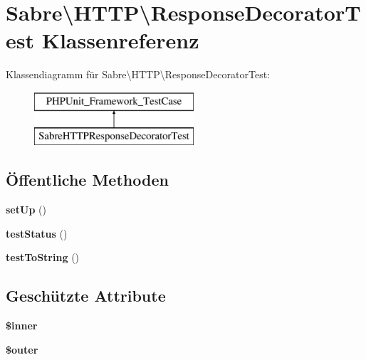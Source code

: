 \hypertarget{class_sabre_1_1_h_t_t_p_1_1_response_decorator_test}{}\section{Sabre\textbackslash{}H\+T\+TP\textbackslash{}Response\+Decorator\+Test Klassenreferenz}
\label{class_sabre_1_1_h_t_t_p_1_1_response_decorator_test}
Klassendiagramm für Sabre\textbackslash{}H\+T\+TP\textbackslash{}Response\+Decorator\+Test\+:\begin{figure}[H]
\begin{center}
\leavevmode
\includegraphics[height=2.000000cm]{class_sabre_1_1_h_t_t_p_1_1_response_decorator_test}
\end{center}
\end{figure}
\subsection*{Öffentliche Methoden}
\begin{DoxyCompactItemize}
\item 
\mbox{\label{class_sabre_1_1_h_t_t_p_1_1_response_decorator_test_adf16a488245407c9aa2bd19720621f0e}} 
{\bfseries set\+Up} ()
\item 
\mbox{\label{class_sabre_1_1_h_t_t_p_1_1_response_decorator_test_aae2bfa0a51eb5a6a6bc58e28f0667917}} 
{\bfseries test\+Status} ()
\item 
\mbox{\label{class_sabre_1_1_h_t_t_p_1_1_response_decorator_test_af6476042d3da4ceab64e46ffcaaf0947}} 
{\bfseries test\+To\+String} ()
\end{DoxyCompactItemize}
\subsection*{Geschützte Attribute}
\begin{DoxyCompactItemize}
\item 
\mbox{\label{class_sabre_1_1_h_t_t_p_1_1_response_decorator_test_a8eb78b153878d9d3daac4113b0d09923}} 
{\bfseries \$inner}
\item 
\mbox{\label{class_sabre_1_1_h_t_t_p_1_1_response_decorator_test_afe5867d08f29dfbc39333505ce1cfb82}} 
{\bfseries \$outer}
\end{DoxyCompactItemize}



